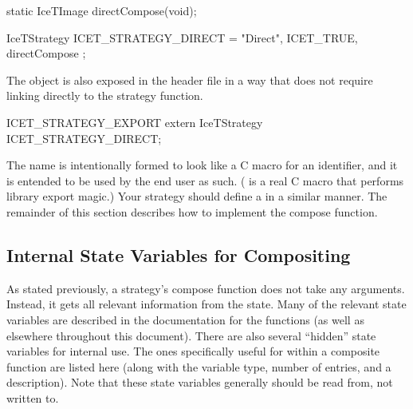 \begin{code}
static IceTImage directCompose(void);

IceTStrategy ICET_STRATEGY_DIRECT = { "Direct", ICET_TRUE, directCompose };
\end{code}

The object is also exposed in the
 header file in a way
that does not require linking directly to the strategy function.
\begin{code}
ICET_STRATEGY_EXPORT extern IceTStrategy ICET_STRATEGY_DIRECT;
\end{code}

The  name is intentionally formed to look
like a C macro for an identifier, and it is entended to be used by the end
user as such.  ( is a real C macro that
performs library export magic.)  Your strategy should define a
 in a similar manner.  The remainder of this section
describes how to implement the compose function.

\subsection{Internal State Variables for Compositing}

As stated previously, a strategy's compose function does not take any
arguments.  Instead, it gets all relevant information from the \IceT state.
Many of the relevant state variables are described in the documentation for
the  functions (as well as elsewhere throughout this
document).  There are also several ``hidden'' state variables for internal
use.  The ones specifically useful for within a composite function are
listed here (along with the variable type, number of entries, and a
description).  Note that these state variables generally should be read
from, not written to.

